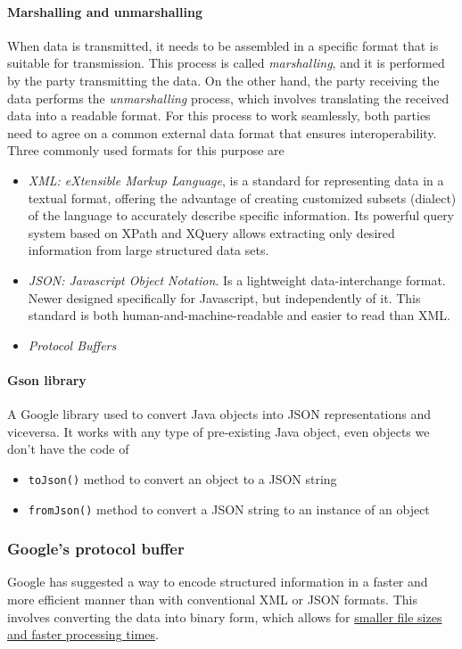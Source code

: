 \paragraph{Marshalling and unmarshalling}
When data is transmitted, it needs to be assembled in a specific format that is suitable for transmission. This process is called \textit{marshalling}, and it is performed by the party transmitting the data. On the other hand, the party receiving the data performs the \textit{unmarshalling} process, which involves translating the received data into a readable format. For this process to work seamlessly, both parties need to agree on a common external data format that ensures interoperability. Three commonly used formats for this purpose are
\begin{itemize}
    \item \textit{XML: eXtensible Markup Language}, is a standard for representing data in a textual format, offering the advantage of creating customized subsets (dialect) of the language to accurately describe specific information. Its powerful query system based on XPath and XQuery allows extracting only desired information from large structured data sets.
    \item \textit{JSON: Javascript Object Notation}. Is a lightweight data-interchange format. Newer designed specifically for Javascript, but independently of it. This standard is both human-and-machine-readable and easier to read than XML.
    \item \textit{Protocol Buffers}
\end{itemize}

\paragraph{Gson library}
A Google library used to convert Java objects into JSON representations and viceversa. It works with any type of pre-existing Java object, even objects we don’t have the code of
\begin{itemize}
    \item \texttt{toJson()} method to convert an object to a JSON string
    \item \texttt{fromJson()} method to convert a JSON string to an instance of an object
\end{itemize}

\subsubsection{Google's protocol buffer}
Google has suggested a way to encode structured information in a faster and more efficient manner than with conventional XML or JSON formats. This involves converting the data into binary form, which allows for \uline{smaller file sizes and faster processing times}.

